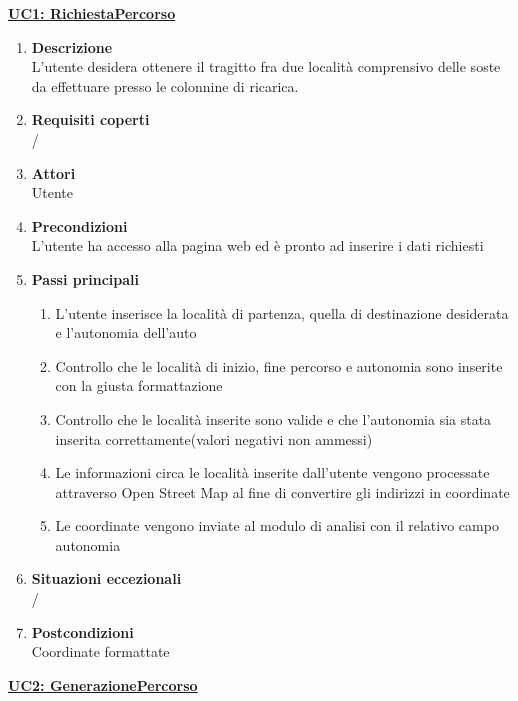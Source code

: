 \underline{\textbf{UC1: RichiestaPercorso}}

\begin{enumerate}
\item\textbf{Descrizione} \\ L'utente desidera ottenere il tragitto fra due località comprensivo delle soste da effettuare presso le colonnine di ricarica. %
\item\textbf{Requisiti coperti}\\ /
\item\textbf{Attori} \\ Utente
\item\textbf{Precondizioni} \\ L'utente ha accesso alla pagina web ed è pronto ad inserire i dati richiesti
\item\textbf{Passi principali}
\begin{enumerate}
\item L'utente inserisce la località di partenza, quella di destinazione desiderata e l'autonomia dell'auto
\item Controllo che le località di inizio, fine percorso e autonomia sono inserite con la giusta formattazione 
\item Controllo che le località inserite sono valide e che l'autonomia sia stata inserita correttamente(valori negativi non ammessi)
\item Le informazioni circa le località inserite dall'utente vengono processate attraverso Open Street Map al fine di convertire gli indirizzi in coordinate
\item Le coordinate vengono inviate al modulo di analisi con il relativo campo autonomia
\end{enumerate}
\item\textbf{Situazioni eccezionali} \\ /
\item\textbf{Postcondizioni} \\ Coordinate formattate
\end{enumerate}

\underline{\textbf{UC2: GenerazionePercorso}}

